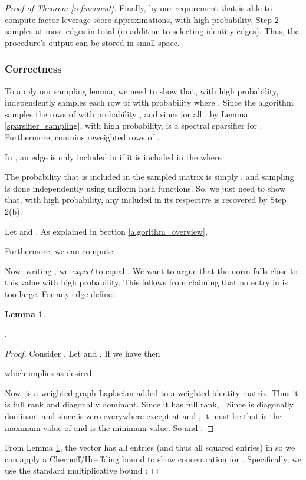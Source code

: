 \documentclass[11pt]{article}
\newtheorem{lemma}{Lemma}
\begin{document}
\begin{proof}[Proof of Theorem \ref{refinement}]
Finally, by our requirement that  is able to compute  factor leverage score approximations, with high probability, Step 2 samples at most  edges in total (in addition to selecting  identity edges). Thus, the procedure's output can be stored in small space.

\subsubsection*{Correctness}

To apply our sampling lemma, we need to show that, with high probability,  independently samples each row of  with probability  where . Since the algorithm samples the rows of  with probability , and since  for all , by Lemma \ref{sparsifier_sampling}, with high probability,  is a  spectral sparsifier for . Furthermore,  contains  reweighted rows of .

In , an edge is only included in  if it is included in the  where


The probability that  is included in the sampled matrix  is simply , and sampling is done independently using uniform hash functions. So, we just need to show that, with high probability, any  included in its respective  is recovered by Step 2(b).

Let  and . 
As explained in Section \ref{algorithm_overview},
 
Furthermore, we can compute:
 
Now, writing , we \emph{expect}  to equal . We want to argue that the norm falls close to this value with high probability. This follows from claiming that no entry in  is too large.
For any edge  define:


\begin{lemma}\label{leverage_score_bound}\end{lemma}.
\begin{proof}



Consider . 
Let  and . If we have  then


which implies  as desired.


Now,  is a weighted graph Laplacian added to a weighted identity matrix. Thus it is full rank and diagonally dominant. Since it has full rank, . Since  is diagonally dominant and since  is zero everywhere except at  and , it must be that   is the maximum value of  and  is the minimum value. So  and .

\end{proof}
From Lemma \ref{leverage_score_bound}, the vector  has all entries (and thus all squared entries) in  so we can apply a Chernoff/Hoeffding bound to show concentration for . Specifically, we use the standard multiplicative bound \cite{Hoeffding:1963}:


\end{proof}
\end{document}
